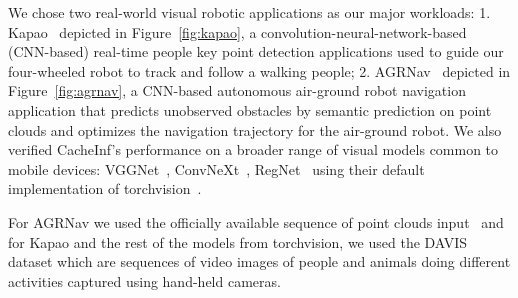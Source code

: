 We chose two real-world visual robotic applications as our major workloads: 1. Kapao~\cite{kapao} depicted in Figure~\ref{fig:kapao}, a convolution-neural-network-based (CNN-based) real-time people key point detection applications used to guide our four-wheeled robot to track and follow a walking people;
2. AGRNav~\cite{agrnav} depicted in Figure~\ref{fig:agrnav}, a CNN-based autonomous air-ground robot navigation application that predicts unobserved obstacles by semantic prediction on point clouds and optimizes the navigation trajectory for the air-ground robot.
We also verified CacheInf's performance on a broader range of visual models common to mobile devices: VGGNet~\cite{simonyan2015deep}, ConvNeXt~\cite{woo2023convnext}, RegNet~\cite{xu2022regnet} using their default implementation of torchvision~\cite{noauthor_torchvision_nodate}. 

For AGRNav we used the officially available sequence of point clouds input~\cite{agrnav} and for Kapao and the rest of the models from torchvision, we used the DAVIS~\cite{Perazzi2016} dataset which are sequences of video images of people and animals doing different activities captured using hand-held cameras.

